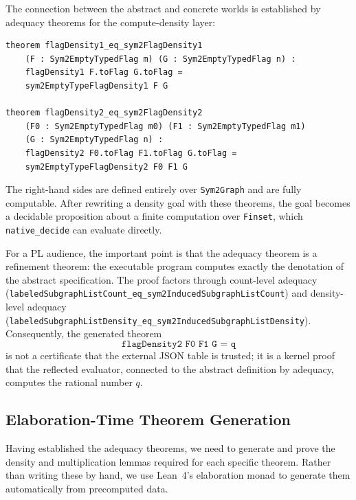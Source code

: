 \documentclass{article}
\newcommand{\lean}[1]{\texttt{#1}}
\begin{document}
The connection between the abstract and concrete worlds is established by
adequacy theorems for the compute-density layer:
\begin{lstlisting}
theorem flagDensity1_eq_sym2FlagDensity1
    (F : Sym2EmptyTypedFlag m) (G : Sym2EmptyTypedFlag n) :
    flagDensity1 F.toFlag G.toFlag =
    sym2EmptyTypeFlagDensity1 F G

theorem flagDensity2_eq_sym2FlagDensity2
    (F0 : Sym2EmptyTypedFlag m0) (F1 : Sym2EmptyTypedFlag m1)
    (G : Sym2EmptyTypedFlag n) :
    flagDensity2 F0.toFlag F1.toFlag G.toFlag =
    sym2EmptyTypeFlagDensity2 F0 F1 G
\end{lstlisting}
The right-hand sides are defined entirely over \lean{Sym2Graph} and are fully
computable.  After rewriting a density goal with these theorems, the goal
becomes a decidable proposition about a finite computation over
\lean{Finset}, which \lean{native\_decide} can evaluate directly.

For a PL audience, the important point is that the adequacy theorem is a
refinement theorem: the executable program computes exactly the denotation of
the abstract specification.  The proof factors through count-level adequacy
(\lean{labeledSubgraphListCount\_eq\_sym2InducedSubgraphListCount}) and
density-level adequacy
(\lean{labeledSubgraphListDensity\_eq\_sym2InducedSubgraphListDensity}).
Consequently, the generated theorem
\[
  \lean{flagDensity2 F0 F1 G = q}
\]
is not a certificate that the external JSON table is trusted; it is a kernel
proof that the reflected evaluator, connected to the abstract definition by
adequacy, computes the rational number $q$.

\subsection{Elaboration-Time Theorem Generation}

Having established the adequacy theorems, we need to generate and prove the
density and multiplication lemmas required for each specific theorem.  Rather
than writing these by hand, we use Lean~4's elaboration monad to generate
them automatically from precomputed data.
\end{document}
